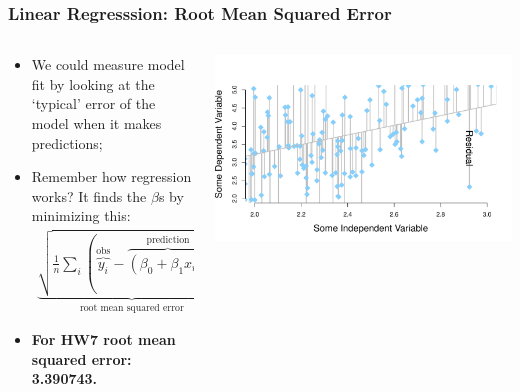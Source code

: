 \documentclass[aspectratio=169]{beamer}
\theoremstyle{principle}
\begin{document}
\begin{frame}
\frametitle{Linear Regresssion: Root Mean Squared Error}

\begin{columns}
\begin{column}{0.5\textwidth}

\begin{itemize}
\item We could measure model fit by looking at the `typical' error of the model when it makes predictions;
\bigskip

\item Remember how regression works?  It finds the $\beta$s by minimizing this:
\begin{align*}
\underbrace{\sqrt{\frac{1}{n}\sum_i(\overbrace{y_i}^{\mbox{obs}} - \overbrace{(\beta_0 + \beta_1 x_i)}^{\mbox{prediction}})^2}}_{\mbox{root mean squared error}}
\end{align*}

\item[] \color{white} \textbf{For HW7 root mean squared error: 3.390743.}
\end{itemize}

\end{column}
\begin{column}{0.5\textwidth}
\includegraphics[scale=0.35]{point_cloud_line_zoomed_residuals.pdf}
\end{column}
\end{columns}

\end{frame}
\end{document}
